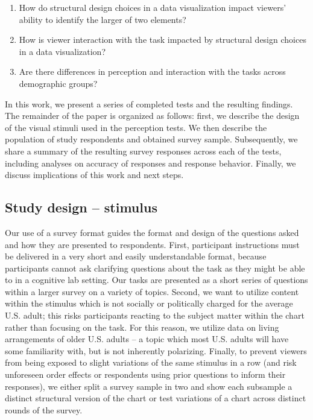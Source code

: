 \documentclass[
]{jds}
\begin{document}
\begin{enumerate}
\def\labelenumi{\arabic{enumi}.}
\item
  How do structural design choices in a data visualization impact
  viewers' ability to identify the larger of two elements?
\item
  How is viewer interaction with the task impacted by structural design
  choices in a data visualization?
\item
  Are there differences in perception and interaction with the tasks
  across demographic groups?
\end{enumerate}

In this work, we present a series of completed tests and the resulting
findings. The remainder of the paper is organized as follows: first, we
describe the design of the visual stimuli used in the perception tests.
We then describe the population of study respondents and obtained survey
sample. Subsequently, we share a summary of the resulting survey
responses across each of the tests, including analyses on accuracy of
responses and response behavior. Finally, we discuss implications of
this work and next steps.

\hypertarget{study-design-stimulus}{%
\subsection{Study design -- stimulus}\label{study-design-stimulus}}

Our use of a survey format guides the format and design of the questions
asked and how they are presented to respondents. First, participant
instructions must be delivered in a very short and easily understandable
format, because participants cannot ask clarifying questions about the
task as they might be able to in a cognitive lab setting. Our tasks are
presented as a short series of questions within a larger survey on a
variety of topics. Second, we want to utilize content within the
stimulus which is not socially or politically charged for the average
U.S. adult; this risks participants reacting to the subject matter
within the chart rather than focusing on the task. For this reason, we
utilize data on living arrangements of older U.S. adults -- a topic
which most U.S. adults will have some familiarity with, but is not
inherently polarizing. Finally, to prevent viewers from being exposed to
slight variations of the same stimulus in a row (and risk unforeseen
order effects or respondents using prior questions to inform their
responses), we either split a survey sample in two and show each
subsample a distinct structural version of the chart or test variations
of a chart across distinct rounds of the survey.
\end{document}
